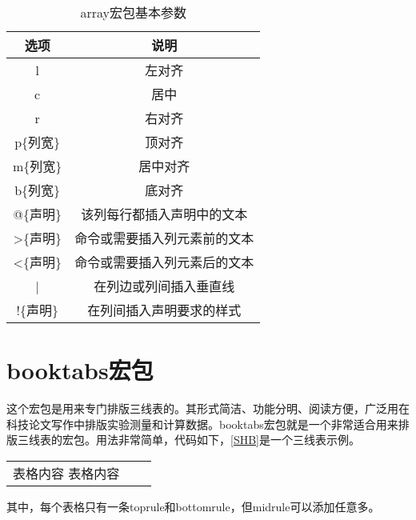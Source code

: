 \begin{table}[!ht]
    \caption{array宏包基本参数}
    \begin{center}
    \begin{tabular}{|c|c|}
    \hline 
    选项    &    说明 \\ 
    \hline
    l    &    左对齐 \\ 
    \hline
    c    &    居中 \\ 
    \hline
    r    &    右对齐 \\ 
    \hline
    p\{列宽\}    &    顶对齐 \\ 
    \hline
    m\{列宽\}    &    居中对齐 \\ 
    \hline
    b\{列宽\}    &    底对齐 \\ 
    \hline
    @\{声明\}    &    该列每行都插入声明中的文本 \\ 
    \hline
    >\{声明\}    &    命令或需要插入列元素前的文本 \\ 
    \hline
    <\{声明\}    &    命令或需要插入列元素后的文本 \\ 
    \hline
    |    &    在列边或列间插入垂直线 \\ 
    \hline
    !\{声明\}    &    在列间插入声明要求的样式 \\ 
    \hline
    \end{tabular}
\end{center}
\end{table}

\section{booktabs宏包}

这个宏包是用来专门排版三线表的。其形式简洁、功能分明、阅读方便，广泛用在科技论文写作中排版实验测量和计算数据。booktabs宏包就是一个非常适合用来排版三线表的宏包。用法非常简单，代码如下，\autoref{SHB}是一个三线表示例。

\begin{latex}
\begin{tabular}{lll}
    \toprule[2pt]
    表格内容
    \midrule[0.5pt]
    表格内容
    \bottomrule[0.5pt]
\end{tabular}
\end{latex}

其中，每个表格只有一条toprule和bottomrule，但midrule可以添加任意多。

